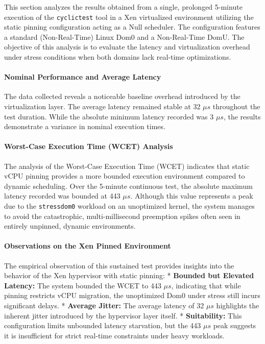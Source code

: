 This section analyzes the results obtained from a single, prolonged
5-minute execution of the \texttt{cyclictest} tool in a Xen virtualized
environment utilizing the static pinning configuration acting as a Null
scheduler. The configuration features a standard (Non-Real-Time) Linux
Dom0 and a Non-Real-Time DomU. The objective of this analysis is to
evaluate the latency and virtualization overhead under stress conditions
when both domains lack real-time optimizations.

\paragraph{Nominal Performance and Average
Latency}\label{nominal-performance-and-average-latency-19}

The data collected reveals a noticeable baseline overhead introduced by
the virtualization layer. The average latency remained stable at 32 $\mu s$
throughout the test duration. While the absolute minimum latency
recorded was 3 $\mu s$, the results demonstrate a variance in nominal
execution times.

\paragraph{Worst-Case Execution Time (WCET)
Analysis}\label{worst-case-execution-time-wcet-analysis-21}

The analysis of the Worst-Case Execution Time (WCET) indicates that
static vCPU pinning provides a more bounded execution environment
compared to dynamic scheduling. Over the 5-minute continuous test, the
absolute maximum latency recorded was bounded at 443 $\mu s$. Although this
value represents a peak due to the \texttt{stressdom0} workload on an
unoptimized kernel, the system manages to avoid the catastrophic,
multi-millisecond preemption spikes often seen in entirely unpinned,
dynamic environments.

\paragraph{Observations on the Xen Pinned
Environment}\label{observations-on-the-xen-pinned-environment}

The empirical observation of this sustained test provides insights into
the behavior of the Xen hypervisor with static pinning: *
\textbf{Bounded but Elevated Latency:} The system bounded the WCET to
443 $\mu s$, indicating that while pinning restricts vCPU migration, the
unoptimized Dom0 under stress still incurs significant delays. *
\textbf{Average Jitter:} The average latency of 32 $\mu s$ highlights the
inherent jitter introduced by the hypervisor layer itself. *
\textbf{Suitability:} This configuration limits unbounded latency
starvation, but the 443 $\mu s$ peak suggests it is insufficient for strict
real-time constraints under heavy workloads.

